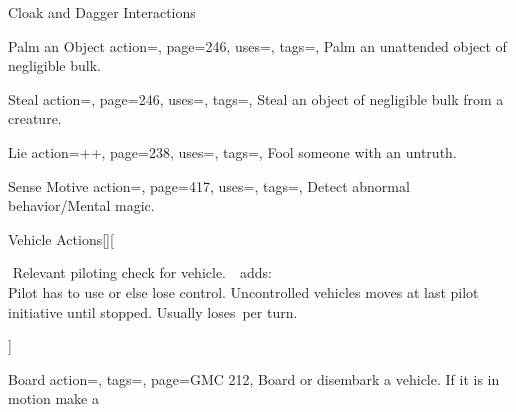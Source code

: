 \begin{PageBackLandscape}
\begin{TablesHalf}{\backTableHeight}
\begin{Table}{Cloak and Dagger Interactions}
\begin{entry}{Palm an Object}{%
                action=,
                page=246,
                uses=\Thievery,
                tags=\Manipulate,
            }
                Palm an unattended object of negligible bulk.\hfill
            \end{entry}
            \begin{entry}{Steal}{%
                action=,
                page=246,
                uses=\Thievery,
                tags=\Manipulate,
            }
                Steal an object of negligible bulk from a creature.\hfill
            \end{entry}
            \breakLine
            \begin{entry}{Lie}{%
                action=++,
                page=238,
                uses={\Deception[tags={S}]},
                tags=\Mental\Concentrate,
            }
                Fool someone with an untruth. \Auditory\,\Linguistic \hfill
            \end{entry}
            \begin{entry}{Sense Motive}{%
                action=,
                page=417,
                uses={\Perception[tags={S}]},
                tags=\Concentrate,
            }
                Detect abnormal behavior/Mental magic. \hfill
                \;
            \end{entry}
        \end{Table}
        \TableSpace
        \begin{Table}{Vehicle Actions}[][%
            \begin{minipage}[b]{0.755\linewidth}%
                \Piloting\,\dash\,Relevant piloting check for vehicle. \hfill
                \Reck \,\dash\,  adds:
                \textbf{}\\
                Pilot has to use  or  else lose control.\hfill
                Uncontrolled vehicles moves at last pilot initiative until stopped.
                Usually loses \,\Feet per turn.%
            \end{minipage}%
        ]
            \begin{entry}{Board}{%
                action=,
                tags=\Move,
                page=GMC 212,
            }
                Board or disembark a vehicle. \hfill
                If it is in motion make a

\end{entry}
\end{Table}
\end{TablesHalf}
\end{PageBackLandscape}
